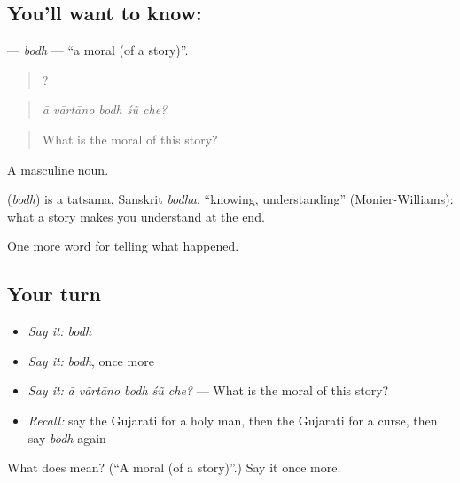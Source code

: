 \subsection*{You'll want to know: }
\textbf{} — \emph{bodh} — \textquotedblleft{}a moral (of a story)\textquotedblright{}.

\begin{quote}
    ?
\end{quote}

\begin{quote}
\emph{ā vārtāno bodh śũ che?}
\end{quote}

\begin{quote}
What is the moral of this story?
\end{quote}

A masculine noun.

\begin{cousinweb}
\textbf{} (\emph{bodh}) is a tatsama, Sanskrit \emph{bodha}, \textquotedblleft{}knowing, understanding\textquotedblright{} (Monier-Williams): what a story makes you understand at the end.
\end{cousinweb}

\begin{grammarlens}[title={What you've built}]
One more word for telling what happened.
\end{grammarlens}

\subsection*{Your turn}
\begin{itemize}
\raggedright
  \item \emph{Say it:} \emph{bodh}
  \item \emph{Say it:} \emph{bodh}, once more
  \item \emph{Say it:} \emph{ā vārtāno bodh śũ che?} — What is the moral of this story?
  \item \emph{Recall:} say the Gujarati for a holy man, then the Gujarati for a curse, then say \emph{bodh} again
\end{itemize}

\begin{tcolorbox}[breakable,colback=teal!4,colframe=teal!35!black,title={Before you move on}]
What does  mean? (\textquotedblleft{}A moral (of a story)\textquotedblright{}.) Say it once more.
\end{tcolorbox}
